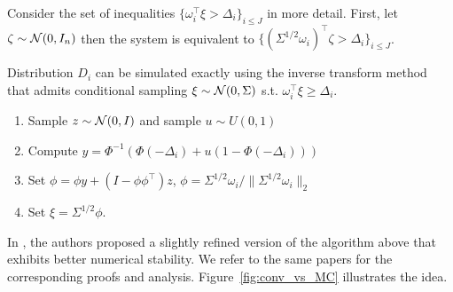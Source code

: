 \documentclass{IEEEtran4PSCC}
\newcommand{\cN}{{\cal N}}
\begin{document}
Consider the set of inequalities $\{\omega_i^\top \xi > \Delta_i\}_{i\le J}$ in more detail. First, let $\zeta \sim \cN(0, I_n)$ then the system is equivalent to $\{(\Sigma^{1/2}\omega_i)^\top 
\zeta > \Delta_i\}_{i\le J}$. 


Distribution $D_i$ can be simulated exactly using the inverse transform method \cite{l2009monte,morlet1983sampling} that admits conditional sampling $\xi \sim \cN(0, \Sigma)$ s.t. $\omega_i^\top \xi \ge \Delta_i$. 
\begin{enumerate}
  \item Sample $z \sim \cN(0, I)$ and sample $u \sim U(0,1)$
  \item Compute $y = \Phi^{-1}(\Phi(-\Delta_i) + u(1 - \Phi(-\Delta_i)))$
  \item Set $\phi = \phi y + (I - \phi\phi^\top) z$, $\phi = \Sigma^{1/2} \omega_i / \|\Sigma^{1/2} \omega_i\|_2$
  \item Set $\xi = \Sigma^{1/2} \phi$.
\end{enumerate}

In \cite{owen2019importance,lukashevich2021power}, the authors proposed a slightly refined version of the algorithm above that exhibits better numerical stability. We refer to the same papers for the corresponding proofs and analysis. Figure~\ref{fig:conv_vs_MC} illustrates the idea. 
\end{document}
